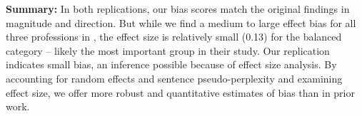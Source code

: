 \vspace{0.5em} 
\noindent \textbf{Summary:} 
In both replications, our bias scores match the original findings in magnitude and direction. 
%
But while we find a medium to large effect bias for all three professions in \citet{bartl-etal-2020-unmasking}, the effect size is relatively small (0.13) for the balanced category -- likely the most important group in their study.
%
Our \citet{limisiewicz-marecek-2022-dont} replication indicates small bias, an inference possible because of effect size analysis.
%
By accounting for random effects and sentence pseudo-perplexity and examining effect size, we offer more robust and quantitative estimates of bias than in prior work.

\begingroup

\renewcommand{\arraystretch}{1.2}

